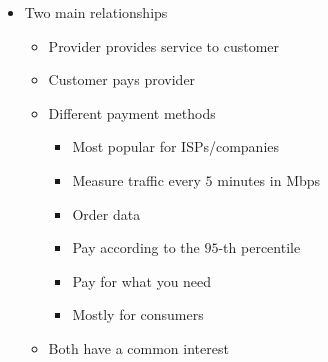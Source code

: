 \begin{itemize}
\begin{itemize}
\begin{itemize}
\begin{itemize}
                            \item Two main relationships
                                \begin{itemize}
                                    \item Provider provides service to customer
                                    \item Customer pays provider
                                    \item Different payment methods
                                        \begin{itemize}
                                                \begin{itemize}
                                                    \item Most popular for ISPs/companies
                                                    \item Measure traffic every $5$ minutes in Mbps
                                                    \item Order data
                                                    \item Pay according to the $95$-th percentile
                                                \end{itemize}
                                                \begin{itemize}
                                                    \item Pay for what you need
                                                \end{itemize}
                                                \begin{itemize}
                                                    \item Mostly for consumers
                                                \end{itemize}
                                        \end{itemize}
                                \end{itemize}
                                \begin{itemize}
                                    \item Both have a common interest

\end{itemize}
\end{itemize}
\end{itemize}
\end{itemize}
\end{itemize}
